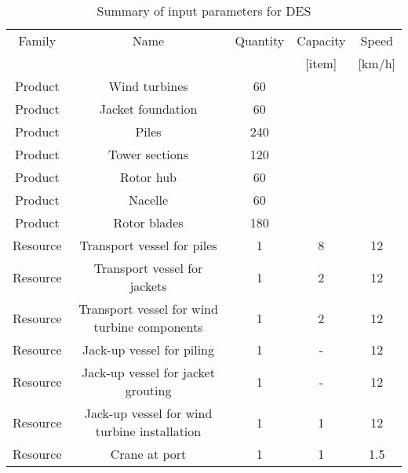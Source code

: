 \begin{table}
\label{tab:input}
\begin{tabular}{ccccc}
\hline 
Family & Name & Quantity & Capacity & Speed \\
& & & [item] & [km/h] \\ 
\hline 
Product & Wind turbines & 60 & & \\ 
Product & Jacket foundation & 60 & & \\
Product & Piles & 240 & & \\
Product & Tower sections & 120 & & \\ 
Product & Rotor hub & 60 & & \\ 
Product & Nacelle & 60 & & \\ 
Product & Rotor blades & 180 & & \\ 
\hline
Resource & Transport vessel for piles & 1 & 8 & 12 \\ 
Resource & Transport vessel for jackets & 1 & 2 & 12 \\ 
Resource & Transport vessel for wind turbine components & 1 & 2 & 12 \\ 
Resource & Jack-up vessel for piling & 1 & - & 12\\
Resource & Jack-up vessel for jacket grouting & 1 & - & 12\\
Resource & Jack-up vessel for wind turbine installation & 1 & 1 & 12 \\
Resource & Crane at port & 1 & 1 & 1.5 \\
\hline 
\end{tabular}

\caption{Summary of input parameters for DES}
\end{table}
